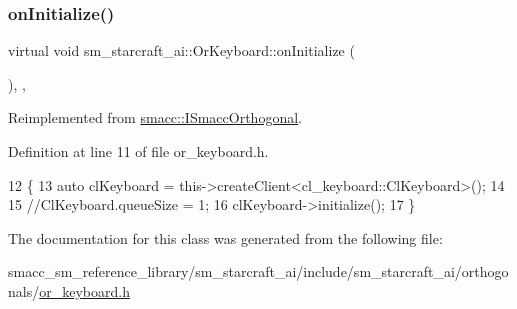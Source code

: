 \subsubsection{\texorpdfstring{on\+Initialize()}{onInitialize()}}
{\footnotesize\ttfamily virtual void sm\+\_\+starcraft\+\_\+ai\+::\+Or\+Keyboard\+::on\+Initialize (\begin{DoxyParamCaption}{ }\end{DoxyParamCaption})\hspace{0.3cm}{\ttfamily [inline]}, {\ttfamily [override]}, {\ttfamily [virtual]}}



Reimplemented from \hyperlink{classsmacc_1_1ISmaccOrthogonal_a6bb31c620cb64dd7b8417f8705c79c7a}{smacc\+::\+I\+Smacc\+Orthogonal}.



Definition at line 11 of file or\+\_\+keyboard.\+h.


\begin{DoxyCode}
12     \{
13         \textcolor{keyword}{auto} clKeyboard = this->createClient<cl\_keyboard::ClKeyboard>();
14         
15         \textcolor{comment}{//ClKeyboard.queueSize = 1;}
16         clKeyboard->initialize();
17     \}
\end{DoxyCode}


The documentation for this class was generated from the following file\+:\begin{DoxyCompactItemize}
\item 
smacc\+\_\+sm\+\_\+reference\+\_\+library/sm\+\_\+starcraft\+\_\+ai/include/sm\+\_\+starcraft\+\_\+ai/orthogonals/\hyperlink{sm__starcraft__ai_2include_2sm__starcraft__ai_2orthogonals_2or__keyboard_8h}{or\+\_\+keyboard.\+h}\end{DoxyCompactItemize}
